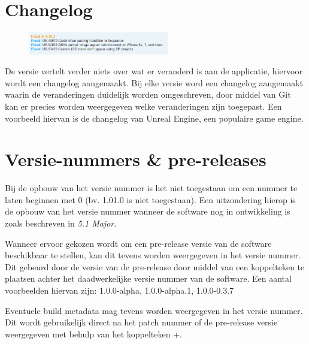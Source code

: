 \clearpage
\section{Changelog}
\begin{figure}
	\includegraphics[width=0.55\textwidth]{images/Changelog.png}	
\end{figure}
De versie vertelt verder niets over wat er veranderd is aan de applicatie, hiervoor wordt een changelog aangemaakt.
Bij elke versie word een changelog aangemaakt waarin de veranderingen duidelijk worden omgeschreven, door middel van Git kan er precies worden weergegeven welke veranderingen zijn toegepast.
Een voorbeeld hiervan is de changelog van Unreal Engine, een populaire game engine.

\section{Versie-nummers \& pre-releases}
Bij de opbouw van het versie nummer is het niet toegestaan om een nummer te laten beginnen met 0 (bv. 1.01.0 is niet toegestaan). Een uitzondering hierop is de opbouw van het versie nummer wanneer de software nog in ontwikkeling is zoals beschreven in \textit{5.1 Major}.

Wanneer ervoor gekozen wordt om een pre-release versie van de software beschikbaar te stellen, kan dit tevens worden weergegeven in het versie nummer. Dit gebeurd door de versie van de pre-release door middel van een koppelteken te plaatsen achter het daadwerkelijke versie nummer van de software. Een aantal voorbeelden hiervan zijn: 1.0.0-alpha, 1.0.0-alpha.1, 1.0.0-0.3.7

Eventuele build metadata mag tevens worden weergegeven in het versie nummer. Dit wordt gebruikelijk direct na het patch nummer of de pre-release versie weergegeven met behulp van het koppelteken +.